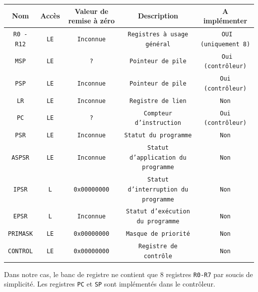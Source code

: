 \documentclass{article}
\begin{document}
    \begin{tabular}{|c|c|c|c|c|}
        \hline
        \textbf{Nom}    & \textbf{Accès} & \textbf{Valeur de remise à zéro} & \textbf{Description} & \textbf{A implémenter}\\
        \hline
        \texttt{R0 - R12} & \texttt{LE}    & \texttt{Inconnue}              & \texttt{Registres à usage général} & \texttt{ OUI (uniquement 8)}\\
        \hline
        \texttt{MSP}    & \texttt{LE}    & \texttt{?}                   & \texttt{Pointeur de pile}                   & \texttt{ Oui (contrôleur)}   \\
        \hline
        \texttt{PSP}     & \texttt{LE}    & \texttt{Inconnue}             & \texttt{Pointeur de pile}                   & \texttt{Oui (contrôleur)}    \\
        \hline
        \texttt{LR}     & \texttt{LE}    & \texttt{Inconnue}             & \texttt{Registre de lien}                   & \texttt{Non}                 \\
        \hline
        \texttt{PC}     & \texttt{LE}    & \texttt{?}                   & \texttt{Compteur d'instruction}             & \texttt{Oui (contrôleur)}    \\
        \hline
        \texttt{PSR}    & \texttt{LE}    & \texttt{Inconnue}             & \texttt{Statut du programme}                & \texttt{Non}                 \\
        \hline
        \texttt{ASPSR}  & \texttt{LE}    & \texttt{Inconnue}             & \texttt{Statut d'application du programme} & \texttt{Non}\\
        \hline
        \texttt{IPSR}   & \texttt{L}     & \texttt{0x00000000}           & \texttt{Statut d'interruption du programme} & \texttt{Non}\\
        \hline
        \texttt{EPSR}   & \texttt{L}     & \texttt{Inconnue}             & \texttt{Statut d'exécution du programme} & \texttt{Non}\\
        \hline
        \texttt{PRIMASK}  & \texttt{LE}    & \texttt{0x00000000}           & \texttt{Masque de priorité}                 & \texttt{Non}                 \\
        \hline
        \texttt{CONTROL}  & \texttt{LE}    & \texttt{0x00000000}           & \texttt{Registre de contrôle} & \texttt{Non}\\
        \hline
    \end{tabular}

    Dans notre cas, le banc de registre ne contient que 8 registres \texttt{R0-R7} par soucis de simplicité.
    Les registres \texttt{PC} et \texttt{SP} sont implémentés dans le contrôleur.
\end{document}
